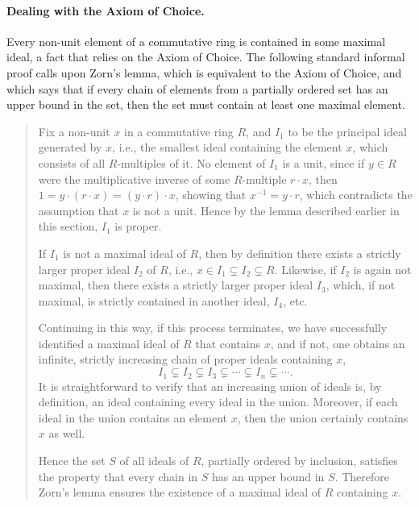 \documentclass{article}
\begin{document}
\paragraph{Dealing with the Axiom of Choice.}
Every non-unit element of a commutative ring is contained in some maximal
ideal, a fact that relies on the Axiom of Choice. 
The following standard informal
proof calls upon Zorn's lemma, which is equivalent to the Axiom of Choice, and which 
says that if every chain of elements from a partially ordered set  has an upper
bound in the set, then the set must contain at least one maximal element. 

\begin{quote}
	Fix a non-unit $x$ in a commutative ring $R$, and  \(I_{1}\) to be the principal 
	ideal generated by $x$, i.e., the smallest ideal containing the element $x$,
    which consists of all $R$-multiples of it.  No element of $I_1$ is a unit, since if  
    $y \in R$ were the multiplicative inverse of some $R$-multiple
    $r \cdot x$, then $1 = y \cdot (r \cdot x) = (y\cdot r) \cdot x$, showing that $x^{-1} = y \cdot r$, 
    which contradicts the assumption that $x$ is not a unit. Hence by the lemma described earlier in this section, 
    $I_1$ is proper.
   
    If \(I_{1}\) is not a maximal ideal of $R$, then by definition there exists a strictly larger
    proper ideal \(I_{2}\) of $R$, i.e.,
    $x \in I_{1}\subsetneq I_{2} \subsetneq R$. Likewise, if  \(I_{2}\) is again not
    maximal, then there exists a strictly larger proper ideal
    $I_{3}$, which, if not maximal, is strictly contained in another ideal, $I_4$, etc.
    
  
  Continuing in this way, if  this process terminates, we have successfully identified a
    maximal ideal of $R$ that contains $x$, and if not, one obtains an infinite, strictly increasing chain of proper ideals containing $x$, 
    \[I_{1}\subsetneq I_{2}\subsetneq I_{3}\subsetneq\cdots\subsetneq I_n \subsetneq \cdots. \]
    It is straightforward to verify that an increasing union of ideals 
    is, by definition, an ideal containing every ideal in the union.  Moreover, if each ideal in the union
    contains an element $x$, then the union certainly 
       contains \(x\) as well.  
       
      Hence the set $S$ of all ideals of $R$, partially ordered by inclusion, 
       satisfies the property that every chain in $S$ has an upper bound in $S$.
    Therefore Zorn's lemma ensures the existence of a maximal ideal of \(R\) containing \(x\).
\end{quote}
\end{document}
